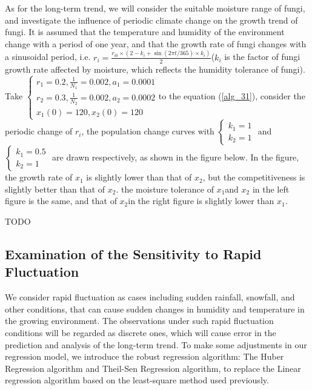 \documentclass{mcmthesis}
\begin{document}
As for the long-term trend, we will consider the suitable moisture range of fungi, and investigate the influence of periodic climate change on the growth trend of fungi. It is assumed that the temperature and humidity of the environment change with a period of one year, and that the growth rate of fungi changes with a sinusoidal period, i.e. $ r_i = \frac {r_{i0} \times (2-k_i + \sin(2\pi t/365)\times k_i ) }{2} $($ k_i $ is the factor of fungi growth rate affected by moisture, which reflects the humidity tolerance of fungi). Take $ \left\{\begin{array}{l}
    r_{1}=0.2, \frac{1}{N_{1}}=0.002, a_{1}=0.0001 \\
    r_{2}=0.3, \frac{1}{N_{2}}=0.002, a_{2}=0.0002 \\
    x_{1}(0)=120, x_{2}(0)=120
    \end{array}\right. $to the equation (\ref{alg_31}), consider the periodic change of $ r_i $,  the population change curves with $ \left\{\begin{array}{l}
    k_{1}=1 \\
    k_{2}=1
    \end{array}\right. $ and $ \left\{\begin{array}{l}
    k_{1}=0.5 \\
    k_{2}=1
    \end{array}\right. $ are drawn respectively, as shown in the figure below. In the figure, the growth rate of $ x_1 $ is slightly lower than that of $ x_2 $, but the competitiveness is slightly better than that of $ x_2 $. the moisture tolerance of $ x_1 $and $ x_2 $ in the left figure is the same, and that of $ x_2 $in the right figure is slightly lower than $ x_1 $.

TODO

\subsection{Examination of the Sensitivity to Rapid Fluctuation}

We consider rapid fluctuation as cases including sudden rainfall, snowfall, and other conditions, that can cause sudden changes in humidity and temperature in the growing environment. The observations under such rapid fluctuation conditions will be regarded as discrete ones, which will cause error in the prediction and analysis of the long-term trend. To make some adjustments  in our regression model, we introduce the robust regression algorithm: The Huber Regression algorithm and Theil-Sen Regression algorithm, to replace the Linear regression algorithm based on the least-square method used previously.
\end{document}
